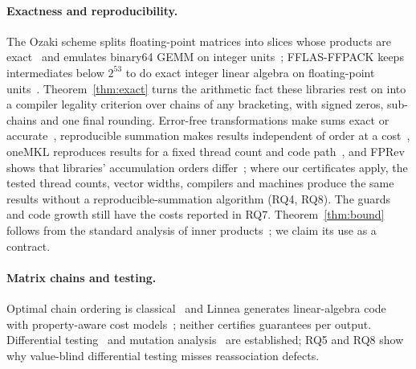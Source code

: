 \documentclass[acmsmall,review,anonymous,nonacm]{acmart}
\begin{document}
\paragraph{Exactness and reproducibility.} The Ozaki scheme splits
floating-point matrices into slices whose products are exact~\cite{ozaki} and
emulates binary64 GEMM on integer units~\cite{ootomo,ozaki2}; FFLAS-FFPACK keeps
intermediates below $2^{53}$ to do exact integer linear algebra on
floating-point units~\cite{fflas}. Theorem~\ref{thm:exact} turns the arithmetic
fact these libraries rest on into a compiler legality criterion over chains of
any bracketing, with signed zeros, sub-chains and one final rounding.
Error-free transformations make sums exact or accurate~\cite{ogita},
reproducible summation makes results independent of order at a
cost~\cite{demmel-nguyen,reproblas}, oneMKL reproduces results for a fixed
thread count and code path~\cite{mkl-cnr}, and FPRev shows that libraries'
accumulation orders differ~\cite{fprev}; where our certificates apply,
the tested thread counts, vector widths, compilers and machines produce
the same results without a reproducible-summation algorithm (RQ4, RQ8).
The guards and code growth still have the costs reported in RQ7. Theorem~\ref{thm:bound} follows from the standard
analysis of inner products~\cite{higham}; we claim its use as a contract.

\paragraph{Matrix chains and testing.} Optimal chain ordering is
classical~\cite{hu-shing} and Linnea generates linear-algebra code with
property-aware cost models~\cite{linnea}; neither certifies guarantees per
output. Differential testing~\cite{csmith} and mutation
analysis~\cite{mutation-survey} are established; RQ5 and RQ8 show why
value-blind differential testing misses reassociation defects.
\end{document}
